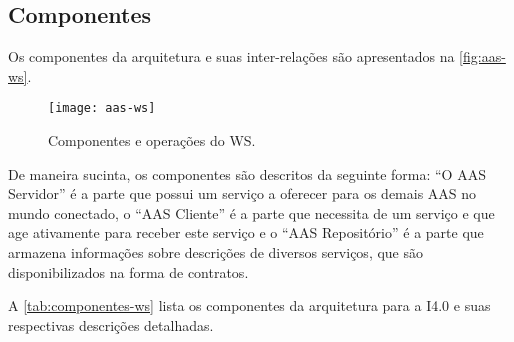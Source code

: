 \subsection{Componentes}

Os componentes da arquitetura e suas inter-relações são apresentados na \autoref{fig:aas-ws}.

\begin{figure}[htb]
	\centering
	\texttt{[image: aas-ws]}
	\caption{Componentes e operações do WS.}
	\label{fig:aas-ws}
\end{figure}

De maneira sucinta, os componentes são descritos da seguinte forma: ``O AAS Servidor'' é a parte que possui um serviço a oferecer para os demais AAS no mundo conectado, o ``AAS Cliente'' é a parte que necessita de um serviço e que age ativamente para receber este serviço e o ``AAS Repositório'' é a parte que armazena informações sobre descrições de diversos serviços, que são disponibilizados na forma de contratos.

A \autoref{tab:componentes-ws} lista os componentes da arquitetura para a I4.0 e suas respectivas descrições detalhadas.

